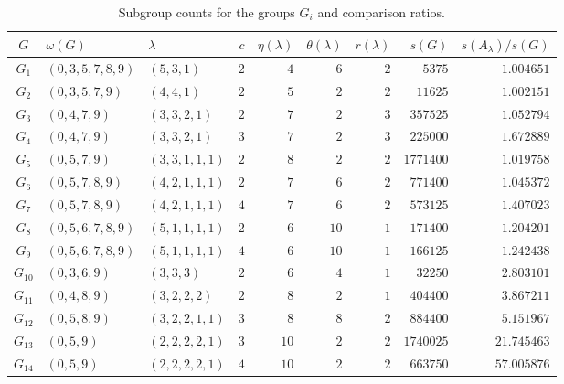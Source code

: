 \documentclass[a4paper,11pt,reqno]{amsart}
\theoremstyle{plain}
\theoremstyle{remark}
\numberwithin{equation}{section}
\begin{document}
\begin{table}[htbp]
\centering
\setlength{\tabcolsep}{3.2pt}
\renewcommand{\arraystretch}{1.12}
\begin{tabular}{@{}cllrrrrrr@{}}
\toprule
$G$ & $\omega(G)$ & $\lambda$ & $c$ & $\eta(\lambda)$ & $\theta(\lambda)$ & $r(\lambda)$
& $s(G)$ & $s(A_\lambda)/s(G)$ \\
\midrule
$G_1$
& $(0,3,5,7,8,9)$ & $(5,3,1)$ & $2$ & $4$ & $6$ & $2$
& $5375$ & $1.004651$ \\

$G_2$
& $(0,3,5,7,9)$ & $(4,4,1)$ & $2$ & $5$ & $2$ & $2$
& $11625$ & $1.002151$ \\

$G_3$
& $(0,4,7,9)$ & $(3,3,2,1)$ & $2$ & $7$ & $2$ & $3$
& $357525$ & $1.052794$ \\

$G_4$
& $(0,4,7,9)$ & $(3,3,2,1)$ & $3$ & $7$ & $2$ & $3$
& $225000$ & $1.672889$ \\

$G_5$
& $(0,5,7,9)$ & $(3,3,1,1,1)$ & $2$ & $8$ & $2$ & $2$
& $1771400$ & $1.019758$ \\

$G_6$
& $(0,5,7,8,9)$ & $(4,2,1,1,1)$ & $2$ & $7$ & $6$ & $2$
& $771400$ & $1.045372$ \\

$G_7$
& $(0,5,7,8,9)$ & $(4,2,1,1,1)$ & $4$ & $7$ & $6$ & $2$
& $573125$ & $1.407023$ \\

$G_8$
& $(0,5,6,7,8,9)$ & $(5,1,1,1,1)$ & $2$ & $6$ & $10$ & $1$
& $171400$ & $1.204201$ \\

$G_9$
& $(0,5,6,7,8,9)$ & $(5,1,1,1,1)$ & $4$ & $6$ & $10$ & $1$
& $166125$ & $1.242438$ \\

$G_{10}$
& $(0,3,6,9)$ & $(3,3,3)$ & $2$ & $6$ & $4$ & $1$
& $32250$ & $2.803101$ \\

$G_{11}$
& $(0,4,8,9)$ & $(3,2,2,2)$ & $2$ & $8$ & $2$ & $1$
& $404400$ & $3.867211$ \\

$G_{12}$
& $(0,5,8,9)$ & $(3,2,2,1,1)$ & $3$ & $8$ & $8$ & $2$
& $884400$ & $5.151967$ \\

$G_{13}$
& $(0,5,9)$ & $(2,2,2,2,1)$ & $3$ & $10$ & $2$ & $2$
& $1740025$ & $21.745463$ \\

$G_{14}$
& $(0,5,9)$ & $(2,2,2,2,1)$ & $4$ & $10$ & $2$ & $2$
& $663750$ & $57.005876$ \\
\bottomrule
\end{tabular}
\vspace{0.3em}
\caption{Subgroup counts for the groups $G_i$ and comparison ratios.}
\label{tab:comparison-5-9}
\end{table}
\end{document}
